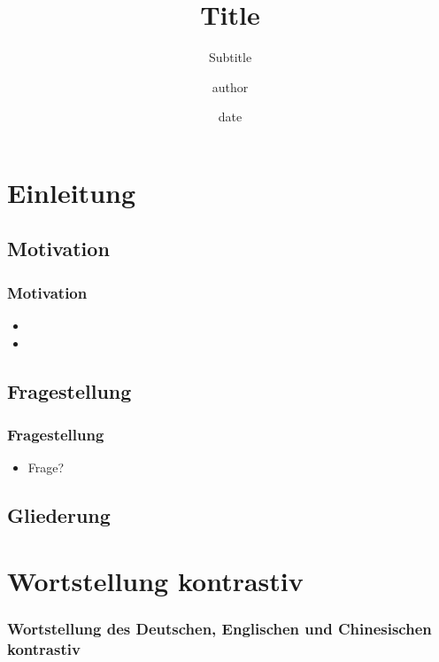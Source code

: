 \documentclass{beamer}
\title[short title]{Title}
\subtitle{Subtitle}
\author{author}
\institute{
	Email}
\date{date}
\begin{document}



\section{Einleitung}
\subsection{Motivation}
\frame
{
  \frametitle{Motivation}

  \begin{itemize}
  \item<1-> 
  \item<1-> 
  \end{itemize}
}

\subsection{Fragestellung}
\frame
{
  \frametitle{Fragestellung}

  \begin{itemize}
  \item<1-> Frage?     
  \end{itemize}
}

\subsection*{Gliederung}

\section{Wortstellung kontrastiv}
\frame
{
  \frametitle{Wortstellung des Deutschen, Englischen und Chinesischen kontrastiv}

}
\end{document}
